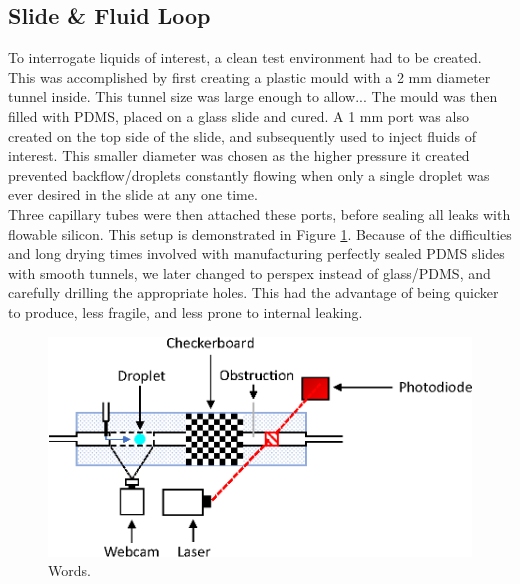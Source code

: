 \documentclass{physics_article_B}
\begin{document}
    \subsection{Slide \& Fluid Loop}
    
        To interrogate liquids of interest, a clean test environment had to be created. This was accomplished by first creating a plastic mould with a 2 mm diameter tunnel inside. This tunnel size was large enough to allow...  The mould was then filled with PDMS, placed on a glass slide and cured. A 1 mm port was also created on the top side of the slide, and subsequently used to inject fluids of interest. This smaller diameter was chosen as the higher pressure it created prevented backflow/droplets constantly flowing when only a single droplet was ever desired in the slide at any one time.\\
        
        Three capillary tubes were then attached these ports, before sealing all leaks with flowable silicon. This setup is demonstrated in Figure \ref{fig:control}. Because of the difficulties and long drying times involved with manufacturing perfectly sealed PDMS slides with smooth tunnels, we later changed to perspex instead of glass/PDMS, and carefully drilling the appropriate holes. This had the advantage of being quicker to produce, less fragile, and less prone to internal leaking. \\
        
            \begin{figure}[H]
            \centering
            \hspace*{2cm}\includegraphics[scale=0.9]{Figures/Control.eps}
            \captionsetup{justification=centering}
            \caption{Words.} 	
            \label{fig:control}
            \end{figure} 
    
\end{document}
